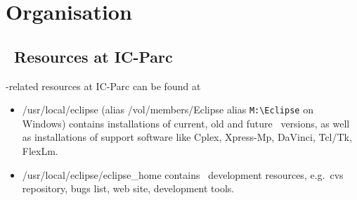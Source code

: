 %
% 
% 
% 
% 
\chapter{Organisation}

\section{\eclipse\ Resources at IC-Parc}

\eclipse-related resources at IC-Parc can be found at
\begin{itemize}
\item /usr/local/eclipse (alias /vol/members/Eclipse alias \verb.M:\Eclipse. on
        Windows)
        contains installations of current, old and future \eclipse\
        versions, as well as installations of support software
        like Cplex, Xpress-Mp, DaVinci, Tcl/Tk, FlexLm.
\item /usr/local/eclipse/eclipse_home contains \eclipse\ development resources,
        e.g.\ cvs repository, bugs list, web site, development tools.
\end{itemize}

